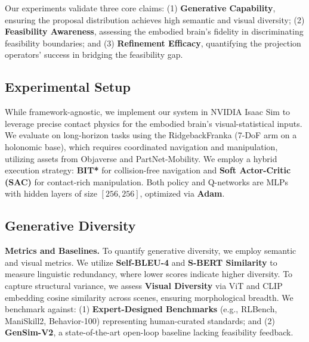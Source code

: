 \documentclass{article}
\theoremstyle{plain}
\theoremstyle{definition}
\theoremstyle{remark}
\begin{document}
 Our experiments validate three core claims: (1) \textbf{Generative Capability}, ensuring the proposal distribution achieves high semantic and visual diversity; (2) \textbf{Feasibility Awareness}, assessing the embodied brain's fidelity in discriminating feasibility boundaries; and (3) \textbf{Refinement Efficacy}, quantifying the projection operators' success in bridging the feasibility gap.


\subsection{Experimental Setup}
\label{subsec:setup}

While framework-agnostic, we implement our system in NVIDIA Isaac Sim to leverage precise contact physics for the embodied brain's visual-statistical inputs. We evaluate on long-horizon tasks using the RidgebackFranka (7-DoF arm on a holonomic base), which requires coordinated navigation and manipulation, utilizing assets from Objaverse and PartNet-Mobility. We employ a hybrid execution strategy: \textbf{BIT*} for collision-free navigation and \textbf{Soft Actor-Critic (SAC)} for contact-rich manipulation. Both policy and Q-networks are MLPs with hidden layers of size $[256, 256]$, optimized via \textbf{Adam}.

\subsection{Generative Diversity}     
\label{sec:exp_diversity}

\textbf{Metrics and Baselines.} To quantify generative diversity, we employ semantic and visual metrics. We utilize \textbf{Self-BLEU-4} and \textbf{S-BERT Similarity} to measure linguistic redundancy, where lower scores indicate higher diversity. To capture structural variance, we assess \textbf{Visual Diversity} via ViT and CLIP embedding cosine similarity across scenes, ensuring morphological breadth. We benchmark against: (1) \textbf{Expert-Designed Benchmarks} (e.g., RLBench, ManiSkill2, Behavior-100) representing human-curated standards; and (2) \textbf{GenSim-V2}, a state-of-the-art open-loop baseline lacking feasibility feedback.
\end{document}
